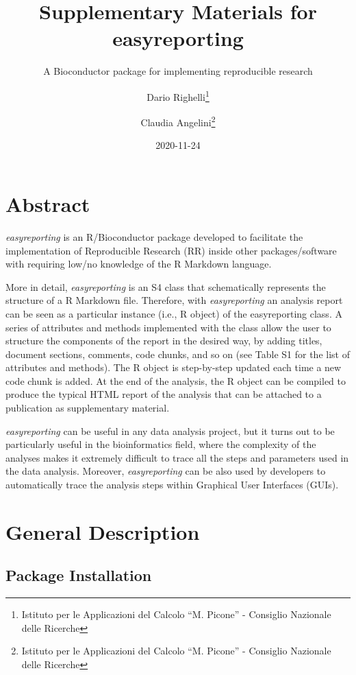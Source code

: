 \documentclass[]{article}
\title{Supplementary Materials for easyreporting}
\subtitle{A Bioconductor package for implementing reproducible research}
\author{Dario Righelli\footnote{Istituto per le Applicazioni del Calcolo ``M.
  Picone'' - Consiglio Nazionale delle Ricerche} \and Claudia Angelini\footnote{Istituto per le Applicazioni del Calcolo ``M.
  Picone'' - Consiglio Nazionale delle Ricerche}}
\date{2020-11-24}
\begin{document}
\maketitle

\newcommand{\beginsupplement}{%
        \setcounter{table}{0}
        \renewcommand{\thetable}{S\arabic{table}}%
        \setcounter{figure}{0}
        \renewcommand{\thefigure}{S\arabic{figure}}%
     }

\hypertarget{abstract}{%
\section{Abstract}\label{abstract}}

\emph{easyreporting} is an R/Bioconductor package developed to
facilitate the implementation of Reproducible Research (RR) inside other
packages/software with requiring low/no knowledge of the R Markdown
language.

More in detail, \emph{easyreporting} is an S4 class that schematically
represents the structure of a R Markdown file. Therefore, with
\emph{easyreporting} an analysis report can be seen as a particular
instance (i.e., R object) of the easyreporting class. A series of
attributes and methods implemented with the class allow the user to
structure the components of the report in the desired way, by adding
titles, document sections, comments, code chunks, and so on (see Table
S1 for the list of attributes and methods). The R object is step-by-step
updated each time a new code chunk is added. At the end of the analysis,
the R object can be compiled to produce the typical HTML report of the
analysis that can be attached to a publication as supplementary
material.

\emph{easyreporting} can be useful in any data analysis project, but it
turns out to be particularly useful in the bioinformatics field, where
the complexity of the analyses makes it extremely difficult to trace all
the steps and parameters used in the data analysis. Moreover,
\emph{easyreporting} can be also used by developers to automatically
trace the analysis steps within Graphical User Interfaces (GUIs).

\hypertarget{general-description}{%
\section{General Description}\label{general-description}}

\hypertarget{package-installation}{%
\subsection{Package Installation}\label{package-installation}}
\end{document}
